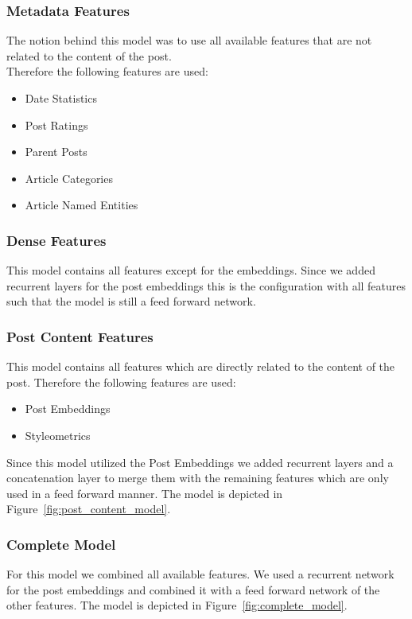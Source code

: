 \documentclass[acmsmall]{acmart}
\begin{document}
\subsubsection{Metadata Features}
The notion behind this model was to use all available features that are not related to the content of the post. \\
Therefore the following features are used:
\begin{itemize}
\item Date Statistics
\item Post Ratings
\item Parent Posts
\item Article Categories
\item Article Named Entities
\end{itemize}

\subsubsection{Dense Features}
This model contains all features except for the embeddings. Since we added recurrent layers for the post embeddings this is the configuration with all features such that the model is still a feed forward network. 


\subsubsection{Post Content Features}
This model contains all features which are directly related to the content of the post. 
Therefore the following features are used:
\begin{itemize}
\item Post Embeddings
\item Styleometrics
\end{itemize}
Since this model utilized the Post Embeddings we added recurrent layers and a concatenation layer to merge them with the remaining features which are only used in a feed forward manner. The model is depicted in Figure~\ref{fig:post_content_model}.


\subsubsection{Complete Model}
For this model we combined all available features. We used a recurrent network for the post embeddings and combined it with a feed forward network of the other features. The model is depicted in Figure~\ref{fig:complete_model}.
\end{document}
